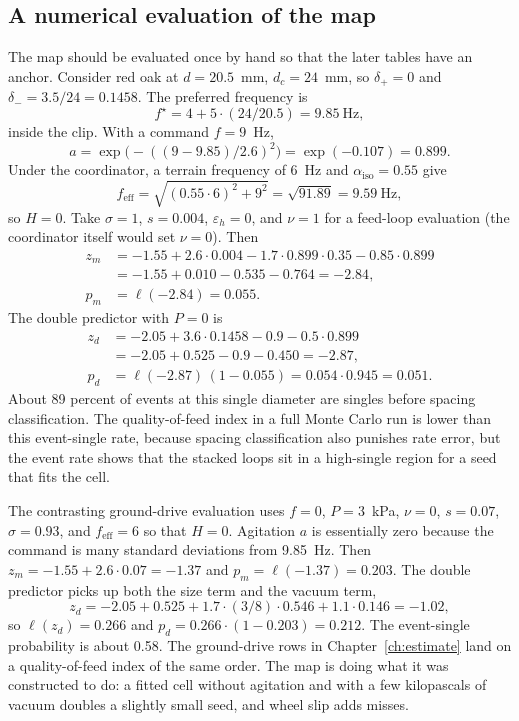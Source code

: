 \subsection{A numerical evaluation of the map}

The map should be evaluated once by hand so that the later tables have an anchor. Consider red oak at $d=20.5$~mm, $d_c=24$~mm, so $\delta_{+}=0$ and $\delta_{-}=3.5/24=0.1458$. The preferred frequency is
\begin{equation}
f^{\star} = 4 + 5\cdot(24/20.5) = 9.85~\text{Hz},
\end{equation}
inside the clip. With a command $f=9$~Hz,
\begin{equation}
a = \exp\big(-((9-9.85)/2.6)^2\big) = \exp(-0.107) = 0.899.
\end{equation}
Under the coordinator, a terrain frequency of 6~Hz and $\alpha_{\mathrm{iso}}=0.55$ give
\begin{equation}
f_{\mathrm{eff}} = \sqrt{(0.55\cdot 6)^2 + 9^2} = \sqrt{91.89} = 9.59~\text{Hz},
\end{equation}
so $H=0$. Take $\sigma=1$, $s=0.004$, $\varepsilon_h=0$, and $\nu=1$ for a feed-loop evaluation (the coordinator itself would set $\nu=0$). Then
\begin{align}
z_m &= -1.55 + 2.6\cdot 0.004 - 1.7\cdot 0.899\cdot 0.35 - 0.85\cdot 0.899 \nonumber\\
&= -1.55 + 0.010 - 0.535 - 0.764 = -2.84,\\
p_m &= \ell(-2.84) = 0.055.
\end{align}
The double predictor with $P=0$ is
\begin{align}
z_d &= -2.05 + 3.6\cdot 0.1458 - 0.9 - 0.5\cdot 0.899 \nonumber\\
&= -2.05 + 0.525 - 0.9 - 0.450 = -2.87,\\
p_d &= \ell(-2.87)\,(1-0.055) = 0.054\cdot 0.945 = 0.051.
\end{align}
About 89 percent of events at this single diameter are singles before spacing classification. The quality-of-feed index in a full Monte Carlo run is lower than this event-single rate, because spacing classification also punishes rate error, but the event rate shows that the stacked loops sit in a high-single region for a seed that fits the cell.

The contrasting ground-drive evaluation uses $f=0$, $P=3$~kPa, $\nu=0$, $s=0.07$, $\sigma=0.93$, and $f_{\mathrm{eff}}=6$ so that $H=0$. Agitation $a$ is essentially zero because the command is many standard deviations from 9.85~Hz. Then $z_m=-1.55+2.6\cdot 0.07=-1.37$ and $p_m=\ell(-1.37)=0.203$. The double predictor picks up both the size term and the vacuum term,
\begin{equation}
z_d = -2.05 + 0.525 + 1.7\cdot(3/8)\cdot 0.546 + 1.1\cdot 0.146 = -1.02,
\end{equation}
so $\ell(z_d)=0.266$ and $p_d=0.266\cdot(1-0.203)=0.212$. The event-single probability is about 0.58. The ground-drive rows in Chapter~\ref{ch:estimate} land on a quality-of-feed index of the same order. The map is doing what it was constructed to do: a fitted cell without agitation and with a few kilopascals of vacuum doubles a slightly small seed, and wheel slip adds misses.

